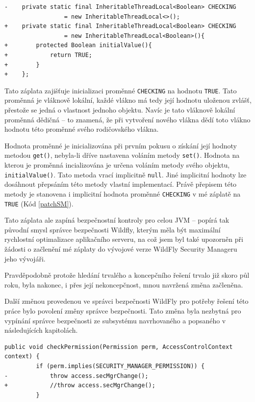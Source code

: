 \begin{lstlisting}[caption=Záplata správce bezpečnosti WildFly nastavující bezpečnostní kontroly na implicitně zapnuté, label=patchSM]
-    private static final InheritableThreadLocal<Boolean> CHECKING
                 = new InheritableThreadLocal<>();
+    private static final InheritableThreadLocal<Boolean> CHECKING
                 = new InheritableThreadLocal<Boolean>(){
+        protected Boolean initialValue(){
+            return TRUE;
+        }
+    };
\end{lstlisting}

Tato záplata zajišťuje inicializaci proměnné {\tt CHECKING} na hodnotu {\tt TRUE}. Tato proměnná je vláknově lokální, každé vlákno má tedy její hodnotu uloženou zvlášť, přestože se jedná o vlastnost jednoho objektu. Navíc je tato vláknově lokální proměnná dědičná -- to znamená, že při vytvoření nového vlákna dědí toto vlákno hodnotu této proměnné svého rodičovského vlákna. \cite{refInheritableThreadLocal}\cite{refThreadLocal}

Hodnota proměnné je inicializována při prvním pokusu o získání její hodnoty metodou {\tt get()}, nebyla-li dříve nastavena voláním metody {\tt set()}. Hodnota na kterou je proměnná incializována je určena voláním metody svého objektu, {\tt initialValue()}. Tato metoda vrací implicitně {\tt null}. Jiné implicitní hodnoty lze dosáhnout přepsáním této metody vlastní implementací. Právě přepisem této metody je stanovena i implicitní hodnota proměnné {\tt CHECKING} v mé záplatě na {\tt TRUE} (Kód \ref{patchSM}). \cite{refThreadLocal}

Tato záplata ale zapíná bezpečnostní kontroly pro celou JVM -- popírá tak původní smysl správce bezpečnosti Wildfly, kterým měla být maximální rychlostní optimalizace aplikačního serveru, na což jsem byl také upozorněn při žádosti o začlenění mé záplaty do vývojové verze WildFly Security Manageru jeho vývojáři. \cite{smPullRequest}

Pravděpodobně protože hledání trvalého a koncepčního řešení trvalo již skoro půl roku, byla nakonec, i přes její nekoncepčnost, mnou navržená změna začleněna. \cite{smPullRequest}\cite{smPullRequestImpl}

Další změnou provedenou ve správci bezpečnosti WildFly pro potřeby řešení této práce bylo povolení změny správce bezpečnosti. Tato změna byla nezbytná pro vypínání správce bezpečnosti ze subsystému navrhovaného a popsaného v následujících kapitolách.

\begin{lstlisting}[caption=Záplata správce bezpečnosti WildFly umožňující vypnutí správce bezpečnosti (zkráceno), label=patchSM]
     public void checkPermission(Permission perm, AccessControlContext context) {
         if (perm.implies(SECURITY_MANAGER_PERMISSION)) {
-            throw access.secMgrChange();
+            //throw access.secMgrChange();
         }
\end{lstlisting}

